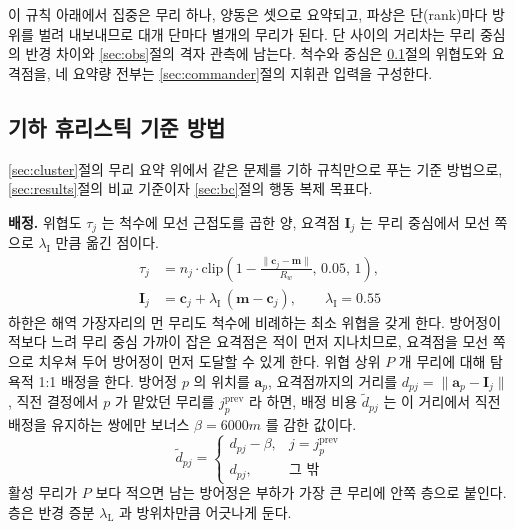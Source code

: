 이 규칙 아래에서 집중은 무리 하나, 양동은 셋으로 요약되고, 파상은 단(rank)마다 방위를
벌려 내보내므로 대개 단마다 별개의 무리가 된다. 단 사이의 거리차는 무리 중심의 반경
차이와 \ref{sec:obs}절의 격자 관측에 남는다. 척수와 중심은
\ref{sec:heuristic}절의 위협도와 요격점을, 네 요약량 전부는 \ref{sec:commander}절의
지휘관 입력을 구성한다.

\subsection{기하 휴리스틱 기준 방법}
\label{sec:heuristic}

\ref{sec:cluster}절의 무리 요약 위에서 같은 문제를 기하 규칙만으로 푸는 기준 방법으로,
\ref{sec:results}절의 비교 기준이자 \ref{sec:bc}절의 행동 복제 목표다.

\textbf{배정.} 위협도 $\tau_j$ 는 척수에 모선 근접도를 곱한 양, 요격점 $\mathbf{I}_j$ 는 무리
중심에서 모선 쪽으로 $\lambda_{\mathrm{I}}$ 만큼 옮긴 점이다.
\begin{equation}
\begin{aligned}
\tau_j &= n_j \cdot \mathrm{clip}\!\left(1 - \frac{\lVert \mathbf{c}_j - \mathbf{m}\rVert}{R_w},
         \, 0.05,\, 1\right),\\
\mathbf{I}_j &= \mathbf{c}_j + \lambda_{\mathrm{I}}\,(\mathbf{m} - \mathbf{c}_j), \qquad \lambda_{\mathrm{I}} = 0.55
\end{aligned}
\label{eq:threat}
\end{equation}
하한은 해역 가장자리의 먼 무리도 척수에 비례하는 최소 위협을 갖게 한다. 방어정이 적보다
느려 무리 중심 가까이 잡은 요격점은 적이 먼저 지나치므로, 요격점을 모선 쪽으로 치우쳐 두어
방어정이 먼저 도달할 수 있게 한다.
위협 상위 $P$ 개 무리에 대해 탐욕적 1:1 배정을 한다. 방어정 $p$ 의 위치를 $\mathbf{a}_p$,
요격점까지의 거리를 $d_{pj} = \lVert \mathbf{a}_p - \mathbf{I}_j \rVert$, 직전 결정에서 $p$ 가
맡았던 무리를 $j_p^{\text{prev}}$ 라 하면, 배정 비용 $\tilde{d}_{pj}$ 는 이 거리에서 직전
배정을 유지하는 쌍에만 보너스 $\beta = 6000\unit{m}$ 를 감한 값이다.
\begin{equation}
\tilde{d}_{pj} = \begin{cases}
  d_{pj} - \beta, & j = j_p^{\text{prev}}\\
  d_{pj},          & \text{그 밖}
\end{cases}
\label{eq:sticky}
\end{equation}
활성 무리가 $P$ 보다 적으면 남는 방어정은 부하가 가장 큰 무리에 안쪽 층으로 붙인다. 층은
반경 증분 $\lambda_{\mathrm{L}}$ 과 방위차만큼 어긋나게 둔다.

